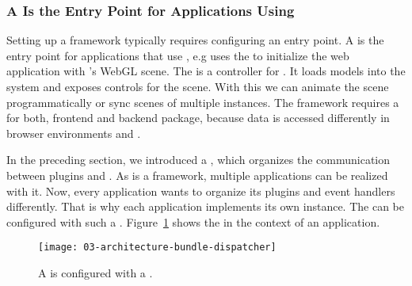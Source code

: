 \documentclass[../../ClassicThesis.tex]{subfiles}
\begin{document}

\subsubsection{A  Is the Entry Point for Applications Using {\convertify}}
\label{sec:bundle-entry-point}

Setting up a framework typically requires configuring an
entry point. A  is the entry point for
applications that use {\convertify}, e.g {\platener} uses
the  to initialize the web application with
{\convertify}'s WebGL scene. The  is a
controller for {\convertify}. It loads models into the
system and exposes controls for the scene. With this we can
animate the scene programmatically or sync scenes of
multiple {\convertify} instances. The framework requires a
 for both, frontend and backend package,
because data is accessed differently in browser
environments and {\nodejs}.


In the preceding section, we introduced a , which
organizes the communication between plugins and {\convertify}. As
{\convertify} is a framework, multiple applications can be realized
with it. Now, every application wants to organize its plugins and
event handlers differently. That is why each application implements
its own  instance. The  can be
configured with such a .
Figure~\ref{fig:bundle-dispatcher} shows the  in the
context of an application.

\begin{figure}
  \centering
  \texttt{[image: 03-architecture-bundle-dispatcher]}
  \caption{A  is configured with a .}
  \label{fig:bundle-dispatcher}
\end{figure}



\end{document}
